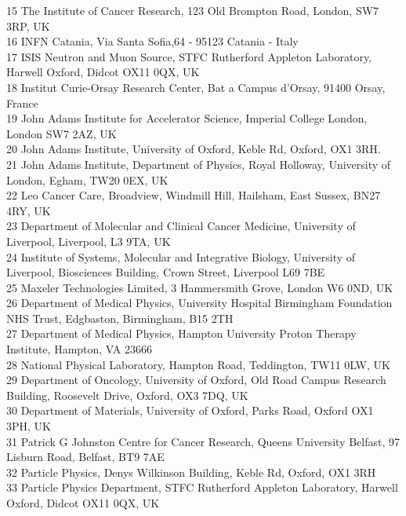 {\begin{tabbing}
     15 \> The Institute of Cancer Research, 123 Old Brompton Road, London, SW7 3RP, UK\\
     16 \> INFN Catania, Via Santa Sofia,64 - 95123 Catania - Italy\\
     17 \> ISIS Neutron and Muon Source, STFC Rutherford Appleton Laboratory, Harwell Oxford, Didcot OX11 0QX, UK\\
     18 \> Institut Curie-Orsay Research Center, Bat a Campus d'Orsay, 91400 Orsay, France\\
     19 \> John Adams Institute for Accelerator Science, Imperial College London, London SW7 2AZ, UK\\
     20 \> John Adams Institute, University of Oxford, Keble Rd, Oxford, OX1 3RH.\\
     21 \> John Adams Institute, Department of Physics, Royal Holloway, University of London, Egham, TW20 0EX, UK\\
     22 \> Leo Cancer Care, Broadview, Windmill Hill, Hailsham, East Sussex, BN27 4RY, UK\\
     23 \> Department of Molecular and Clinical Cancer Medicine, University of Liverpool, Liverpool, L3 9TA, UK\\
     24 \> Institute of Systems, Molecular and Integrative Biology, University of Liverpool, Biosciences Building, Crown Street, Liverpool L69 7BE\\
     25 \> Maxeler Technologies Limited, 3 Hammersmith Grove, London W6 0ND, UK\\
     26 \> Department of Medical Physics, University Hospital Birmingham Foundation NHS Trust, Edgbaston, Birmingham, B15 2TH\\
     27 \> Department of Medical Physics, Hampton University Proton Therapy Institute, Hampton, VA 23666\\
     28 \> National Physical Laboratory, Hampton Road, Teddington, TW11 0LW, UK\\
     29 \> Department of Oncology, University of Oxford, Old Road Campus Research Building, Roosevelt Drive, Oxford, OX3 7DQ, UK\\
     30 \> Department of Materials, University of Oxford, Parks Road, Oxford OX1 3PH, UK\\
     31 \> Patrick G Johnston Centre for Cancer Research, Queens University Belfast, 97 Lisburn Road, Belfast, BT9 7AE\\
     32 \> Particle Physics, Denys Wilkinson Building, Keble Rd, Oxford, OX1 3RH\\
     33 \> Particle Physics Department, STFC Rutherford Appleton Laboratory, Harwell Oxford, Didcot OX11 0QX, UK\\

\end{tabbing}}
